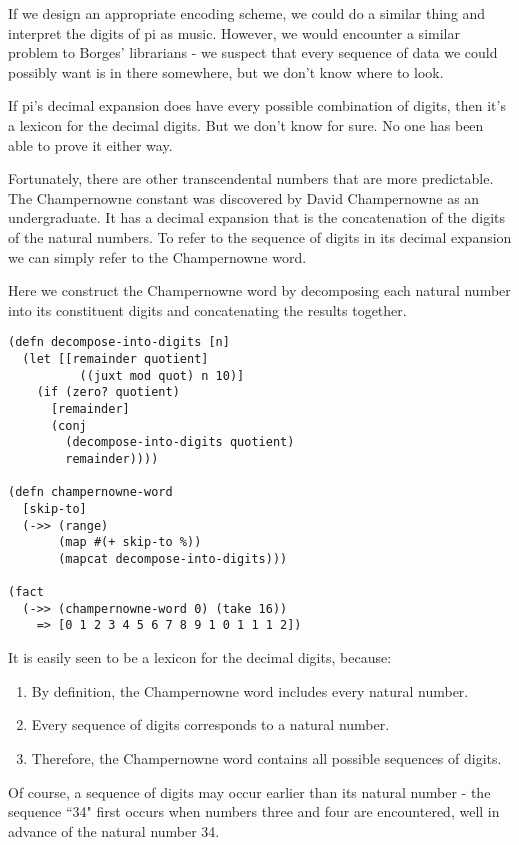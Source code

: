 \documentclass[numbers]{sigplanconf}
\begin{document}
If we design an appropriate encoding scheme, we could do a similar thing and interpret the digits of pi as music. However,
we would encounter a similar problem to Borges' librarians - we suspect that every sequence of data we could possibly want
is in there somewhere, but we don't know where to look.

If pi's decimal expansion does have every possible combination of digits, then it's a lexicon for the decimal digits.
But we don't know for sure. No one has been able to prove it either way.

Fortunately, there are other transcendental numbers that are more predictable. The Champernowne constant was discovered
by David Champernowne as an undergraduate\cite{The construction of decimals normal in the scale of ten}. It has a
decimal expansion that is the concatenation of the digits of the natural numbers. To refer to the sequence of digits
in its decimal expansion we can simply refer to the Champernowne word.

Here we construct the Champernowne word by decomposing each natural number into its constituent digits and concatenating
the results together.

\begin{verbatim}
(defn decompose-into-digits [n]
  (let [[remainder quotient]
          ((juxt mod quot) n 10)]
    (if (zero? quotient)
      [remainder]
      (conj
        (decompose-into-digits quotient)
        remainder))))

(defn champernowne-word
  [skip-to]
  (->> (range)
       (map #(+ skip-to %))
       (mapcat decompose-into-digits)))

(fact
  (->> (champernowne-word 0) (take 16))
    => [0 1 2 3 4 5 6 7 8 9 1 0 1 1 1 2])
\end{verbatim}

It is easily seen to be a lexicon for the decimal digits, because:
\begin{enumerate}
    \item By definition, the Champernowne word includes every natural number.
    \item Every sequence of digits corresponds to a natural number.
    \item Therefore, the Champernowne word contains all possible sequences of digits.
\end{enumerate}
Of course, a sequence of digits may occur earlier than its natural number - the sequence ``34" first occurs when numbers three and
four are encountered, well in advance of the natural number 34.
\end{document}
